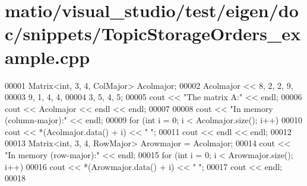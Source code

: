 \hypertarget{matio_2visual__studio_2test_2eigen_2doc_2snippets_2_topic_storage_orders__example_8cpp_source}{}\section{matio/visual\+\_\+studio/test/eigen/doc/snippets/\+Topic\+Storage\+Orders\+\_\+example.cpp}
\label{matio_2visual__studio_2test_2eigen_2doc_2snippets_2_topic_storage_orders__example_8cpp_source}

\begin{DoxyCode}
00001 Matrix<int, 3, 4, ColMajor> Acolmajor;
00002 Acolmajor << 8, 2, 2, 9,
00003              9, 1, 4, 4,
00004          3, 5, 4, 5;
00005 cout << \textcolor{stringliteral}{"The matrix A:"} << endl;
00006 cout << Acolmajor << endl << endl; 
00007 
00008 cout << \textcolor{stringliteral}{"In memory (column-major):"} << endl;
00009 \textcolor{keywordflow}{for} (\textcolor{keywordtype}{int} i = 0; i < Acolmajor.size(); i++)
00010   cout << *(Acolmajor.data() + i) << \textcolor{stringliteral}{"  "};
00011 cout << endl << endl;
00012 
00013 Matrix<int, 3, 4, RowMajor> Arowmajor = Acolmajor;
00014 cout << \textcolor{stringliteral}{"In memory (row-major):"} << endl;
00015 \textcolor{keywordflow}{for} (\textcolor{keywordtype}{int} i = 0; i < Arowmajor.size(); i++)
00016   cout << *(Arowmajor.data() + i) << \textcolor{stringliteral}{"  "};
00017 cout << endl;
00018 
\end{DoxyCode}
